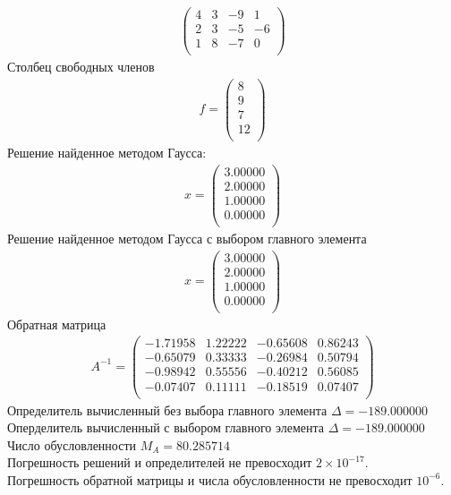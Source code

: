 \documentclass[a4paper,12pt,titlepage,finall]{article}
\begin{document}
\begin{enumerate}
\begin{align*}
\begin{pmatrix}
         4&           3&          -9&           1 \\
         2&           3&          -5&          -6 \\
         1&           8&          -7&           0 \\
\end{pmatrix}
\end{align*}
Столбец свободных членов
\begin{align*}
f = \begin{pmatrix}
8 \\
         9 \\
         7 \\
        12 \\
\end{pmatrix}
\end{align*}
Решение найденное методом Гаусса:
\begin{align*}
x = \begin{pmatrix}
3.00000 \\
   2.00000 \\
   1.00000 \\
   0.00000 \\
\end{pmatrix}
\end{align*}
Решение найденное методом Гаусса с выбором главного элемента
\begin{align*}
x = \begin{pmatrix}
3.00000 \\
   2.00000 \\
   1.00000 \\
   0.00000 \\
\end{pmatrix}
\end{align*}
Обратная матрица
\begin{align*}
A^{-1} = \begin{pmatrix}
  -1.71958&     1.22222&    -0.65608&     0.86243 \\
  -0.65079&     0.33333&    -0.26984&     0.50794 \\
  -0.98942&     0.55556&    -0.40212&     0.56085 \\
  -0.07407&     0.11111&    -0.18519&     0.07407 \\
\end{pmatrix}
\end{align*}
Определитель вычисленный без выбора главного элемента  $\Delta = -189.000000$\\
Оперделитель вычисленный с выбором главного элемента $\Delta = -189.000000$\\
Число обусловленности $M_A = 80.285714$\\
Погрешность решений и определителей не превосходит $2 \times 10^{-17}$.\\
Погрешность обратной матрицы и числа обусловленности не превосходит $10^{-6}$.


\end{enumerate}
\end{document}
